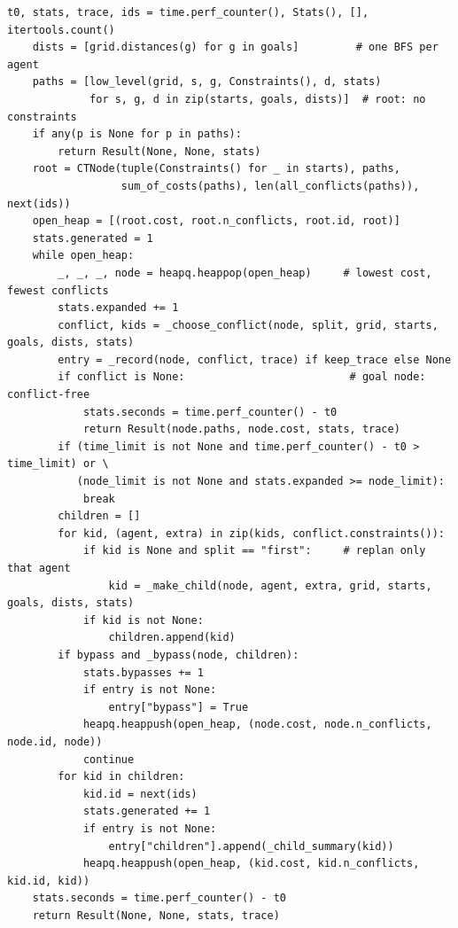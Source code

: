\begin{lstlisting}[caption={The body of the high level \code{cbs()}: root, best-first loop on the sum of costs, split, replan of one agent, optional bypass (from \code{code/ch09\_cbs.py}; \code{\_make\_child} unions the parent's constraints with the new one and calls \code{low\_level} for that agent only).},label={lst:ch09-highlevel}]
    t0, stats, trace, ids = time.perf_counter(), Stats(), [], itertools.count()
    dists = [grid.distances(g) for g in goals]         # one BFS per agent
    paths = [low_level(grid, s, g, Constraints(), d, stats)
             for s, g, d in zip(starts, goals, dists)]  # root: no constraints
    if any(p is None for p in paths):
        return Result(None, None, stats)
    root = CTNode(tuple(Constraints() for _ in starts), paths,
                  sum_of_costs(paths), len(all_conflicts(paths)), next(ids))
    open_heap = [(root.cost, root.n_conflicts, root.id, root)]
    stats.generated = 1
    while open_heap:
        _, _, _, node = heapq.heappop(open_heap)     # lowest cost, fewest conflicts
        stats.expanded += 1
        conflict, kids = _choose_conflict(node, split, grid, starts, goals, dists, stats)
        entry = _record(node, conflict, trace) if keep_trace else None
        if conflict is None:                          # goal node: conflict-free
            stats.seconds = time.perf_counter() - t0
            return Result(node.paths, node.cost, stats, trace)
        if (time_limit is not None and time.perf_counter() - t0 > time_limit) or \
           (node_limit is not None and stats.expanded >= node_limit):
            break
        children = []
        for kid, (agent, extra) in zip(kids, conflict.constraints()):
            if kid is None and split == "first":     # replan only that agent
                kid = _make_child(node, agent, extra, grid, starts, goals, dists, stats)
            if kid is not None:
                children.append(kid)
        if bypass and _bypass(node, children):
            stats.bypasses += 1
            if entry is not None:
                entry["bypass"] = True
            heapq.heappush(open_heap, (node.cost, node.n_conflicts, node.id, node))
            continue
        for kid in children:
            kid.id = next(ids)
            stats.generated += 1
            if entry is not None:
                entry["children"].append(_child_summary(kid))
            heapq.heappush(open_heap, (kid.cost, kid.n_conflicts, kid.id, kid))
    stats.seconds = time.perf_counter() - t0
    return Result(None, None, stats, trace)
\end{lstlisting}

